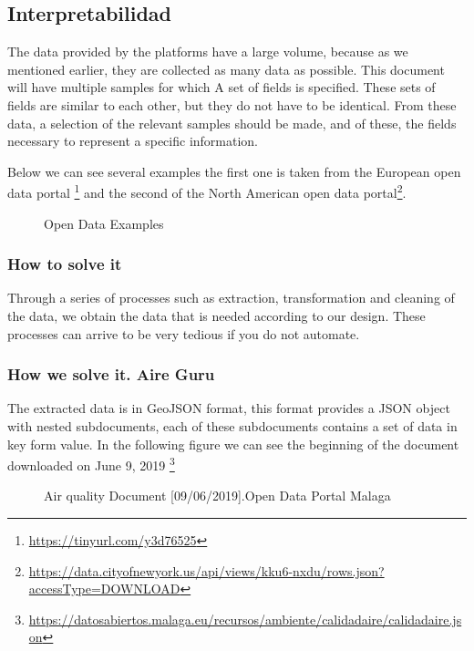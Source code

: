 \subsection{Interpretabilidad}

The data provided by the platforms have a large volume, because as we mentioned earlier, they are collected
as many data as possible. This document will have multiple samples for which
A set of fields is specified. These sets of fields are similar to each other, but they do not have to be identical.
From these data, a selection of the relevant samples should be made, and of these, the fields necessary to represent
a specific information.


Below we can see several examples the first one is taken from the European open data portal
\footnote{\url{https://tinyurl.com/y3d76525}} and the second of the North American open data portal\footnote{\url{https://data.cityofnewyork.us/api/views/kku6-nxdu/rows.json?accessType=DOWNLOAD}}.

\begin{figure}[h]
    \centering
    \hfill
    \caption{Open Data Examples}
\end{figure}

    

    
\subsubsection{How to solve it} 
Through a series of processes such as extraction, transformation and
cleaning of the data, we obtain the data that is needed according to our design. These processes can arrive
to be very tedious if you do not automate.

\subsubsection{How we solve it. Aire Guru} 

The extracted data is in GeoJSON format, this format provides a JSON object with nested subdocuments, each of these
subdocuments contains a set of data in key form value.
In the following figure we can see the beginning of the document downloaded on June 9, 2019
\footnote{\url{https://datosabiertos.malaga.eu/recursos/ambiente/calidadaire/calidadaire.json}}\\
\newpage
\begin{figure}[h]
    \centering
   \hfill
 
    \caption{Air quality Document [09/06/2019].Open Data Portal Malaga}
    \end{figure}
    
